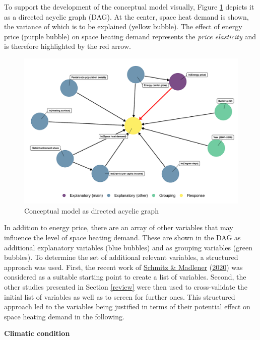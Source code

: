 \documentclass[12pt,twoside]{reedthesis}
\begin{document}
To support the development of the conceptual model visually, Figure \ref{fig:dag} depicts it as a directed acyclic graph (DAG). At the center, space heat demand is shown, the variance of which is to be explained (yellow bubble). The effect of energy price (purple bubble) on space heating demand represents the \emph{price elasticity} and is therefore highlighted by the red arrow.
\begin{figure}

{\centering \includegraphics[width=1\linewidth]{figure/dag_red} 

}

\caption[Conceptual model as directed acyclic graph]{Conceptual model as directed acyclic graph}\label{fig:dag}
\end{figure}
In addition to energy price, there are an array of other variables that may influence the level of space heating demand. These are shown in the DAG as additional explanatory variables (blue bubbles) and as grouping variables (green bubbles). To determine the set of additional relevant variables, a structured approach was used. First, the recent work of \protect\hyperlink{ref-schmitz_madlener20}{Schmitz \& Madlener} (\protect\hyperlink{ref-schmitz_madlener20}{2020}) was considered as a suitable starting point to create a list of variables. Second, the other studies presented in Section \ref{review} were then used to cross-validate the initial list of variables as well as to screen for further ones. This structured approach led to the variables being justified in terms of their potential effect on space heating demand in the following.

\textbf{Climatic condition}
\end{document}
